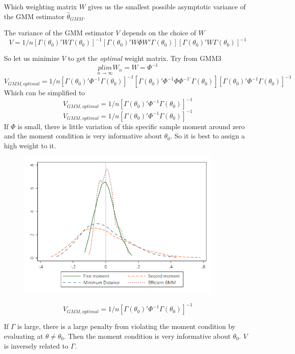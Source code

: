 \documentclass[a4paper,12pt]{article}
\def\emph{\textit}
\begin{document}
Which weighting matrix $W$ gives us the smallest possible asymptotic variance of the GMM estimator $\hat{\theta}_{GMM}$.


The variance of the GMM estimator $V$ depends on the choice of $W$
$$V=1/n[\Gamma(\theta_0)'W\Gamma(\theta_0)]^{-1}[\Gamma(\theta_0)'W\Phi W'\Gamma(\theta_0)][\Gamma(\theta_0)'W\Gamma(\theta_0)]^{-1}$$

So let us minimize $V$ to get the \emph{optimal} weight matrix. Try from GMM3
$$\underset{\scriptscriptstyle n\to\infty}{plim} W_n=W=\Phi^{-1}$$
$$V_{GMM,optimal}=1/n[\Gamma(\theta_0)'\Phi^{-1}\Gamma(\theta_0)]^{-1}[\Gamma(\theta_0)'\Phi^{-1}\Phi \Phi^{-1'}\Gamma(\theta_0)][\Gamma(\theta_0)'\Phi^{-1}\Gamma(\theta_0)]^{-1}$$
Which can be simplified to
$$V_{GMM,optimal}=1/n[\Gamma(\theta_0)'\Phi^{-1}\Gamma(\theta_0)]^{-1}$$
$$V_{GMM,optimal}=1/n[\Gamma(\theta_0)'\Phi^{-1}\Gamma(\theta_0)]^{-1}$$
If $\Phi$ is small, there is little variation of this specific sample moment around zero and the moment condition is very informative about $\theta_0$. So it is best to assign a high weight to it.

\begin{figure}[H]
	\centering
		\includegraphics[width=0.90\textwidth]{figures/efficiency}
	\label{fig:MeanValueTheorem}
\end{figure}

$$V_{GMM,optimal}=1/n[\Gamma(\theta_0)'\Phi^{-1}\Gamma(\theta_0)]^{-1}$$

 If $\Gamma$ is large, there is a large penalty from violating the moment condition by evaluating at $\theta\neq\theta_0$. Then the moment condition is very informative about $\theta_0$. $V$ is inversely related to $\Gamma$.
\end{document}
